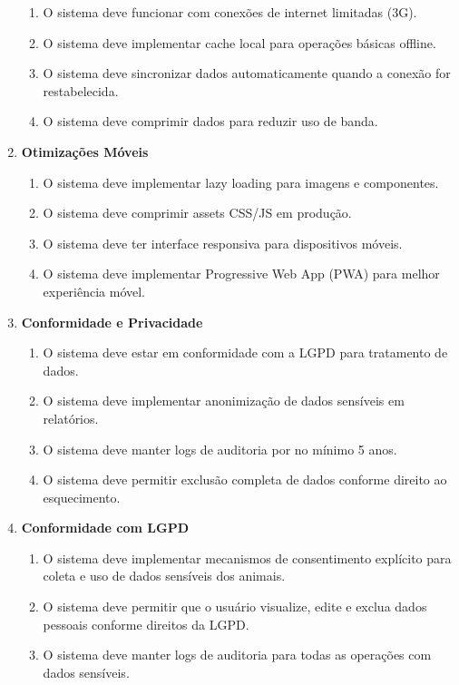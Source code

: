 \documentclass[12pt, a4paper]{article}
\begin{document}
\begin{spacing}{1.5}
\begin{spacing}{1.5}
\begin{enumerate}[label=RNF0\arabic{*}.]
\begin{enumerate}[label=RNF09.0\arabic{*}]
        \item O sistema deve funcionar com conexões de internet limitadas (3G).
        \item O sistema deve implementar cache local para operações básicas offline.
        \item O sistema deve sincronizar dados automaticamente quando a conexão for restabelecida.
        \item O sistema deve comprimir dados para reduzir uso de banda.
    \end{enumerate}
    \item \textbf{Otimizações Móveis}
    \begin{enumerate}[label=RNF10.0\arabic{*}]
        \item O sistema deve implementar lazy loading para imagens e componentes.
        \item O sistema deve comprimir assets CSS/JS em produção.
        \item O sistema deve ter interface responsiva para dispositivos móveis.
        \item O sistema deve implementar Progressive Web App (PWA) para melhor experiência móvel.
    \end{enumerate}
    \item \textbf{Conformidade e Privacidade}
    \begin{enumerate}[label=RNF11.0\arabic{*}]
        \item O sistema deve estar em conformidade com a LGPD para tratamento de dados.
        \item O sistema deve implementar anonimização de dados sensíveis em relatórios.
        \item O sistema deve manter logs de auditoria por no mínimo 5 anos.
        \item O sistema deve permitir exclusão completa de dados conforme direito ao esquecimento.
    \end{enumerate}
        \item \textbf{Conformidade com LGPD}
    \begin{enumerate}[label=RF12.0\arabic{*}]
        \item O sistema deve implementar mecanismos de consentimento explícito para coleta e uso de dados sensíveis dos animais.
        \item O sistema deve permitir que o usuário visualize, edite e exclua dados pessoais conforme direitos da LGPD.
        \item O sistema deve manter logs de auditoria para todas as operações com dados sensíveis.

\end{enumerate}
\end{enumerate}
\end{spacing}
\end{spacing}
\end{document}
